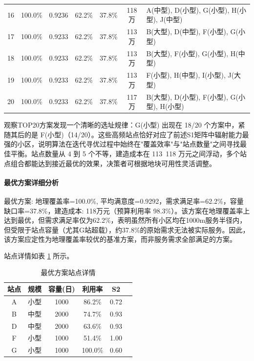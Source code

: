 \documentclass[UTF8]{ctexart}
\begin{document}
\begin{table}[H]
{\begin{tabular}{|c|c|c|c|c|c|l|}
16 & 100.0\% & 0.9236 & 62.2\% & 37.8\% & 118万 & A(中型), D(小型), G(小型), H(小型), J(中型) \\
17 & 100.0\% & 0.9233 & 62.2\% & 37.8\% & 113万 & B(大型), D(中型), F(小型), G(小型) \\
18 & 100.0\% & 0.9233 & 62.2\% & 37.8\% & 113万 & B(大型), F(小型), G(小型), H(中型) \\
19 & 100.0\% & 0.9233 & 62.2\% & 37.8\% & 113万 & F(小型), H(中型), I(小型), J(大型) \\
20 & 100.0\% & 0.9233 & 62.2\% & 37.8\% & 117万 & B(大型), D(小型), F(小型), G(小型), H(小型) \\
\hline
\end{tabular}
}
\end{table}

观察TOP20方案发现一个清晰的选址规律：G(小型) 出现在 18/20 个方案中，紧随其后的是 F(小型)（14/20）。这些高频站点恰好对应了前述S1矩阵中辐射能力最强的小区，说明算法在迭代寻优过程中始终在"覆盖效率"与"站点数量"之间寻找最佳平衡。站点数量从 4 到 5 个不等，建造成本在 113~118 万元之间浮动，多个站点组合都能达到接近最优的效果，决策者可根据地块可用性灵活调整。

\paragraph{最优方案详细分析}

最优方案: 地理覆盖率=100.0\%, 平均满意度=0.9292，需求满足率=62.2\%，容量缺口率=37.8\%，建造成本: 118万元（预算利用率 98.3\%）。该方案在地理覆盖率上达到最优，但需求满足率仅为62.2\%，表明虽然所有小区均在1000m服务半径内，但受限于站点容量（尤其G站超载），约37.8\%的原始需求无法被实际服务。因此，该方案应定性为地理覆盖率较优的基准方案，而非服务需求全部满足的方案。

站点详情如表 \ref{tab:optimal_sites} 所示。

\begin{table}[H]
\centering
\caption{最优方案站点详情}
\label{tab:optimal_sites}
\renewcommand{\arraystretch}{1.3}
\begin{tabular}{|c|c|c|c|c|c|}
\hline
\textbf{站点} & \textbf{规模} & \textbf{容量(日)} & \textbf{利用率} & \textbf{S2} \\
\hline
A & 小型 & 1000 & 86.2\% & 0.72 \\
B & 中型 & 2000 & 74.7\% & 0.93 \\
D & 中型 & 2000 & 63.6\% & 0.93 \\
F & 小型 & 1000 & 51.4\% & 1.00 \\
G & 小型 & 1000 & 100.0\% & 0.60 \\
\hline
\end{tabular}
\end{table}
\end{document}
